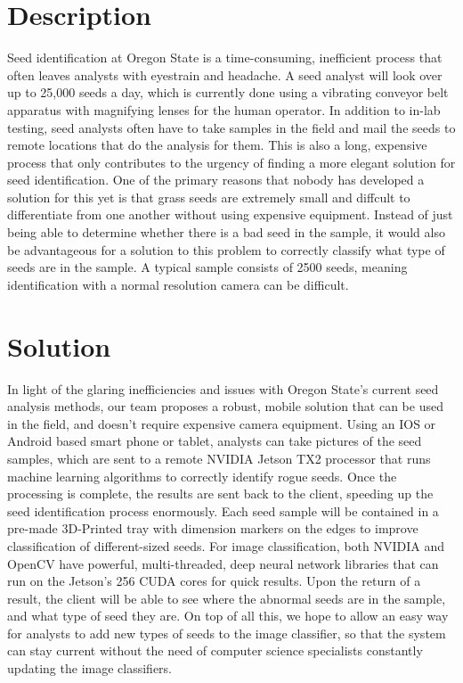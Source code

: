 \documentclass[onecolumn, draftclsnofoot,10pt, compsoc]{IEEEtran}
\begin{document}
\begin{titlepage}
\begin{singlespace}
\begin{abstract}
        \end{abstract}     
    \end{singlespace}
\end{titlepage}
\newpage
{}
\tableofcontents
\clearpage

\section{Description}
Seed identification at Oregon State is a time-consuming, inefficient process that often leaves analysts with eyestrain and headache. A seed analyst will look over up to 25,000 seeds a day, which is currently done using a vibrating conveyor belt apparatus with magnifying lenses for the human operator. In addition to in-lab testing, seed analysts often have to take samples in the field and mail the seeds to remote locations that do the analysis for them. This is also a long, expensive process that only contributes to the urgency of finding a more elegant solution for seed identification. One of the primary reasons that nobody has developed a solution for this yet is that grass seeds are extremely small and diffcult to differentiate from one another without using expensive equipment. Instead of just being able to determine whether there is a bad seed in the sample, it would also be advantageous for a solution to this problem to correctly classify what type of seeds are in the sample. A typical sample consists of 2500 seeds, meaning identification with a normal resolution camera can be difficult.


\section{Solution}
In light of the glaring inefficiencies and issues with Oregon State's current seed analysis methods, our team proposes a robust, mobile solution that can be used in the field, and doesn't require expensive camera equipment. Using an IOS or Android based smart phone or tablet, analysts can take pictures of the seed samples, which are sent to a remote NVIDIA Jetson TX2 processor that runs machine learning algorithms to correctly identify rogue seeds. Once the processing is complete, the results are sent back to the client, speeding up the seed identification process enormously. Each seed sample will be contained in a pre-made 3D-Printed tray with dimension markers on the edges to improve classification of different-sized seeds. For image classification, both NVIDIA and OpenCV have powerful, multi-threaded, deep neural network libraries that can run on the Jetson's 256 CUDA cores for quick results. Upon the return of a result, the client will be able to see where the abnormal seeds are in the sample, and what type of seed they are. On top of all this, we hope to allow an easy way for analysts to add new types of seeds to the image classifier, so that the system can stay current without the need of computer science specialists constantly updating the image classifiers.
\end{document}
